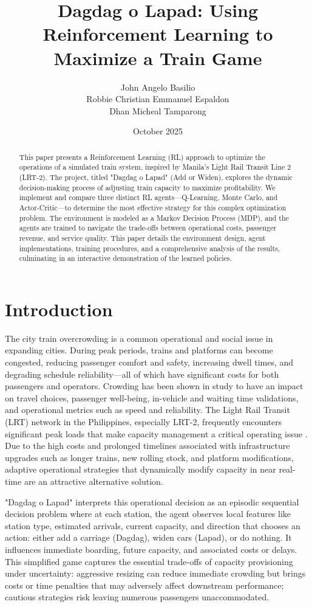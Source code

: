 \documentclass{article}
\title{Dagdag o Lapad: Using Reinforcement Learning to Maximize a Train Game}
\author{John Angelo Basilio \\ Robbie Christian Emmanuel Espaldon \\ Dhan Micheal Tamparong}
\date{October 2025}
\begin{document}
\maketitle

\begin{abstract}
    This paper presents a Reinforcement Learning (RL) approach to optimize the operations of a simulated train system, inspired by Manila's Light Rail Transit Line 2 (LRT-2). The project, titled "Dagdag o Lapad" (Add or Widen), explores the dynamic decision-making process of adjusting train capacity to maximize profitability. We implement and compare three distinct RL agents—Q-Learning, Monte Carlo, and Actor-Critic—to determine the most effective strategy for this complex optimization problem. The environment is modeled as a Markov Decision Process (MDP), and the agents are trained to navigate the trade-offs between operational costs, passenger revenue, and service quality. This paper details the environment design, agent implementations, training procedures, and a comprehensive analysis of the results, culminating in an interactive demonstration of the learned policies.
\end{abstract}

\tableofcontents

\section{Introduction}

The city train overcrowding is a common operational and social issue in expanding cities. During peak periods, trains and platforms can become congested, reducing passenger comfort and safety, increasing dwell times, and degrading schedule reliability—all of which have significant costs for both passengers and operators. Crowding has been shown in study to have an impact on travel choices, passenger well-being, in-vehicle and waiting time validations, and operational metrics such as speed and reliability. The Light Rail Transit (LRT) network in the Philippines, especially LRT-2, frequently encounters significant peak loads that make capacity management a critical operating issue \cite{lrta, philstar}. Due to the high costs and prolonged timelines associated with infrastructure upgrades such as longer trains, new rolling stock, and platform modifications, adaptive operational strategies that dynamically modify capacity in near real-time are an attractive alternative solution.

"Dagdag o Lapad" interprets this operational decision as an episodic sequential decision problem where at each station, the agent observes local features like station type, estimated arrivals, current capacity, and direction that chooses an action: either add a carriage (Dagdag), widen cars (Lapad), or do nothing. It influences immediate boarding, future capacity, and associated costs or delays. This simplified game captures the essential trade-offs of capacity provisioning under uncertainty: aggressive resizing can reduce immediate crowding but brings costs or time penalties that may adversely affect downstream performance; cautious strategies risk leaving numerous passengers unaccommodated.
\end{document}
